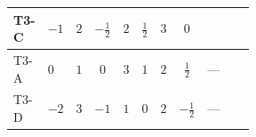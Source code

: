 \documentclass{article}
\begin{document}
\begin{landscape}
\begin{longtable}{@{}llcccccc >{\raggedright\arraybackslash}p{0.54\linewidth}@{}}
\midrule
T3-C & $-1$ & $2$ & $-\frac{1}{2}$ & $2$ & $\frac{1}{2}$ & $3$ & $0$ & \scriptsize\adjustbox{max width=\linewidth}{$\begin{gathered} {\lambda_{12}^{\rm Adj}} (3 \operatorname{Tr}\!\left({y_1}\,\left({y_1}\right)^{\dagger}\right)+3 \operatorname{Tr}\!\left({y_2}\,\left({y_2}\right)^{\dagger}\right)) \\ +{\lambda_{S_1^\dagger S_2 S_2^{\dagger 2}}} \left(\operatorname{Tr}\!\left({y_1}\,\left({y_2}\right)^{\dagger}\right)+\frac{4}{3} (5 \left({\lambda_{S_1^\dagger S_2 S_2^{\dagger 2}}}\right)^{*}+\left({\lambda_{S_1 S_1^{\dagger 2}S_2^\dagger}}\right)^{*})\right) \\ +{\lambda_{S_1 S_1^{\dagger 2}S_2^\dagger}} \left(\operatorname{Tr}\!\left({y_1}\,\left({y_2}\right)^{\dagger}\right)+\frac{4}{3} (\left({\lambda_{S_1^\dagger S_2 S_2^{\dagger 2}}}\right)^{*}+5 \left({\lambda_{S_1 S_1^{\dagger 2}S_2^\dagger}}\right)^{*})\right) \\ +(\left({\lambda_{S_1^\dagger S_2 S_2^{\dagger 2}}}\right)^{*}+\left({\lambda_{S_1 S_1^{\dagger 2}S_2^\dagger}}\right)^{*}) \operatorname{Tr}\!\left({y_2}\,\left({y_1}\right)^{\dagger}\right) \\ -\frac{2}{3} \operatorname{Tr}\!\left({y_1}\,\left({y_1}\right)^{\dagger}\,{y_2}\,\left({y_2}\right)^{\dagger}\right) \\ -\frac{8}{3} \operatorname{Tr}\!\left({y_1}\,\left({y_2}\right)^{\dagger}\,{y_2}\,\left({y_1}\right)^{\dagger}\right) \\ +\frac{64}{3} {\lambda_{S_1^{\dagger 2}S_2^{\dagger 2}}} \left({\lambda_{S_1^{\dagger 2}S_2^{\dagger 2}}}\right)^{*} \\ +\frac{4}{3} {\lambda_{T3}} \left({\lambda_{T3}}\right)^{*} \\ +{g_Y}^2 \left(-6 {g_2}^2-3 {\lambda_{12}^{\rm Adj}}\right) \\ -9 {g_2}^2 {\lambda_{12}^{\rm Adj}} \\ +8 {\lambda_{12}} {\lambda_{12}^{\rm Adj}} \\ +2 {\lambda_{12}^{\rm Adj}} {\lambda_{S_1}} \\ +2 {\lambda_{12}^{\rm Adj}} {\lambda_{S_2}} \\ +{\lambda_{H1}^{\rm Adj}} {\lambda_{H2}^{\rm Adj}}\end{gathered}$} \\
\midrule
T3-A & $0$ & $1$ & $0$ & $3$ & $1$ & $2$ & $\frac{1}{2}$ & --- \\
\midrule
T3-D & $-2$ & $3$ & $-1$ & $1$ & $0$ & $2$ & $-\frac{1}{2}$ & --- \\

\end{longtable}
\end{landscape}
\end{document}

